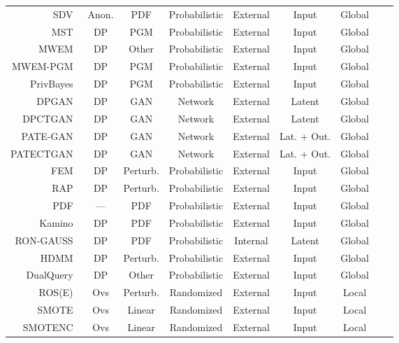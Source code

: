 \begin{longtable}{rcccccccc}
    \bottomrule
    \endlastfoot
    SDV~\cite{patki2016synthetic} & Anon. & PDF & Probabilistic & External & Input & Global \\
    MST~\cite{mckenna2021winning} & DP & PGM & Probabilistic & External & Input & Global \\
    MWEM~\cite{hardt2012simple} & DP & Other & Probabilistic & External & Input & Global \\
    MWEM-PGM~\cite{mckenna2019graphical} & DP & PGM & Probabilistic & External & Input & Global \\
    PrivBayes~\cite{zhang2017privbayes} & DP & PGM & Probabilistic & External & Input & Global \\
    DPGAN~\cite{xie2018differentially} & DP & GAN & Network & External & Latent & Global \\
    DPCTGAN~\cite{rosenblatt2020differentially} & DP & GAN &  Network & External & Latent & Global \\
    PATE-GAN~\cite{jordon2018pate} & DP & GAN & Network & External & Lat. + Out. & Global \\
    PATECTGAN~\cite{rosenblatt2020differentially} & DP & GAN & Network & External & Lat. + Out. & Global \\
    FEM~\cite{vietri2020new} & DP & Perturb. & Probabilistic & External & Input & Global \\
    RAP~\cite{aydore2021differentially} & DP & Perturb. & Probabilistic & External & Input & Global \\
    PDF~\cite{de2019formal, suciu2011probabilistic} & --- & PDF & Probabilistic & External & Input & Global \\
    Kamino~\cite{ge2021kamino} & DP & PDF & Probabilistic & External & Input & Global \\
    RON-GAUSS~\cite{chanyaswad2019ron} & DP & PDF & Probabilistic & Internal & Latent & Global \\
    HDMM~\cite{mckenna2018optimizing} & DP & Perturb. & Probabilistic & External & Input & Global \\
    DualQuery~\cite{gaboardi2014dual} & DP & Other & Probabilistic & External & Input & Global \\
    ROS(E)~\cite{menardi2014training} & Ovs & Perturb. & Randomized & External & Input & Local \\ 
    SMOTE~\cite{Chawla2002} & Ovs & Linear & Randomized & External & Input & Local \\
    SMOTENC~\cite{Chawla2002} & Ovs & Linear & Randomized & External & Input & Local \\

\end{longtable}
